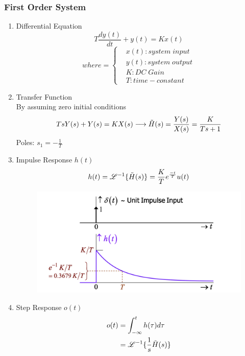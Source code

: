 \documentclass{article}
\begin{document}
\subsubsection{First Order System}
\begin{enumerate}
    \item Differential Equation
    \begin{equation}
        T\frac{dy(t)}{dt}+y(t)=Kx(t)
    \end{equation}
    \[
        where = 
        \begin{cases}
            & x(t) : system\;input \\
            & y(t) : system\;output \\
            & K : DC\;Gain\\
            & T : time-constant
        \end{cases}
    \]
    \item Transfer Function \\
    By assuming zero initial conditions
    \begin{multline}
        TsY(s)+Y(s) = KX(s) \longrightarrow \Tilde{H}(s) = \frac{Y(s)}{X(s)}=\frac{K}{Ts+1} \\ 
    \end{multline}
    Poles: $s_1 = - \frac{1}{T}$
    \item Impulse Response $h(t)$
    \begin{equation}
        h(t) = \mathscr{L}^{-1}\{\Tilde{H}(s)\} = \frac{K}{T}e^{\frac{-t}{T}}u(t) 
    \end{equation}
    \begin{figure}[h]
        \centering
        \includegraphics[width=0.75\linewidth]{e2ba5c9507c51e791e37c061e3eef1a.png}
    \end{figure}
    \item Step Response $o(t)$
    \begin{align*}
        o(t) &=  \int^t_{-\infty}h(\tau)d\tau \\
         &= \mathscr{L}^{-1}\{\frac{1}{s}\Tilde{H}(s)\} \\

\end{align*}
\end{enumerate}
\end{document}
